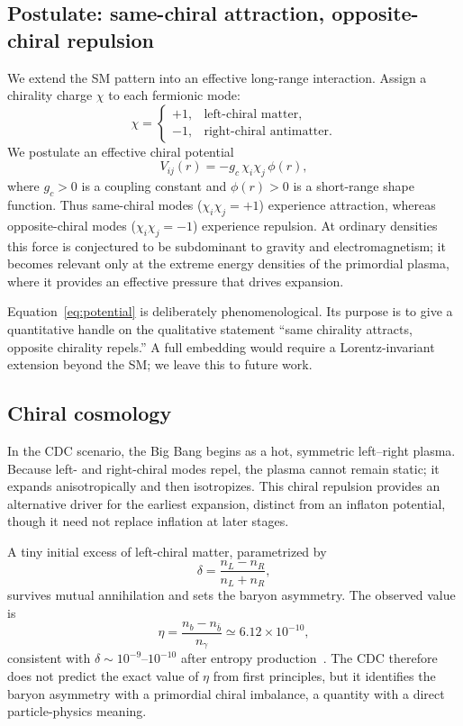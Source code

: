 \documentclass[11pt,a4paper]{article}
\begin{document}
\subsection*{Postulate: same-chiral attraction, opposite-chiral repulsion}

We extend the SM pattern into an effective long-range interaction. Assign a chirality charge $\chi$ to each fermionic mode:
\begin{equation}
\chi =
\begin{cases}
+1, & \text{left-chiral matter},\\
-1, & \text{right-chiral antimatter}.
\end{cases}
\end{equation}
We postulate an effective chiral potential
\begin{equation}
V_{ij}(r)=-g_c\,\chi_i\chi_j\,\phi(r),
\label{eq:potential}
\end{equation}
where $g_c>0$ is a coupling constant and $\phi(r)>0$ is a short-range shape function. Thus same-chiral modes ($\chi_i\chi_j=+1$) experience attraction, whereas opposite-chiral modes ($\chi_i\chi_j=-1$) experience repulsion. At ordinary densities this force is conjectured to be subdominant to gravity and electromagnetism; it becomes relevant only at the extreme energy densities of the primordial plasma, where it provides an effective pressure that drives expansion.

Equation~\eqref{eq:potential} is deliberately phenomenological. Its purpose is to give a quantitative handle on the qualitative statement ``same chirality attracts, opposite chirality repels.'' A full embedding would require a Lorentz-invariant extension beyond the SM; we leave this to future work.

\subsection*{Chiral cosmology}

In the CDC scenario, the Big Bang begins as a hot, symmetric left--right plasma. Because left- and right-chiral modes repel, the plasma cannot remain static; it expands anisotropically and then isotropizes. This chiral repulsion provides an alternative driver for the earliest expansion, distinct from an inflaton potential, though it need not replace inflation at later stages.

A tiny initial excess of left-chiral matter, parametrized by
\begin{equation}
\delta=\frac{n_L-n_R}{n_L+n_R},
\end{equation}
survives mutual annihilation and sets the baryon asymmetry. The observed value is
\begin{equation}
\eta=\frac{n_b-n_{\bar b}}{n_\gamma}\simeq 6.12\times10^{-10},
\end{equation}
consistent with $\delta\sim10^{-9}$--$10^{-10}$ after entropy production~\cite{planck2020,sakharov1967}. The CDC therefore does not predict the exact value of $\eta$ from first principles, but it identifies the baryon asymmetry with a primordial chiral imbalance, a quantity with a direct particle-physics meaning.
\end{document}
